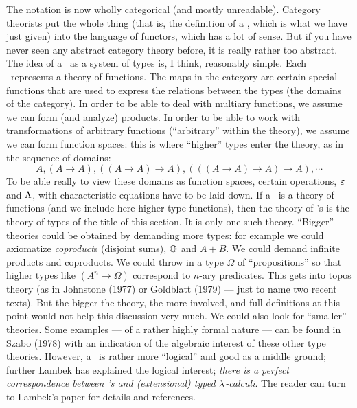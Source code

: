 The notation is now wholly categorical (and mostly unreadable). Category theorists put the
whole thing (that is, the definition of a \ccc, which is what we have just given) into the
language of functors, which has a lot of sense. But if you have never seen any abstract
category theory before, it is really rather too abstract. The idea of a \ccc\ as a system
of types is, I think, reasonably simple. Each \ccc\ represents a theory of functions. The
maps in the category are certain special functions that are used to express the relations
between the types (the domains of the category). In order to be able to deal with multiary
functions, we assume we can form (and analyze) products. In order to be able to work with
transformations of arbitrary functions (``arbitrary'' within the theory), we assume we can
form function spaces: this is where ``higher'' types enter the theory, as in the sequence
of domains:
$$
A, (A \to A), ((A \to A) \to A), (((A \to A) \to A) \to A), \cdots
$$
To be able really to view these domains as function spaces, certain operations, $\varepsilon$ and
$\Lambda$, with characteristic equations have to be laid down. If a \ccc\ is a theory of
functions (and we include here higher-type functions), then the theory of \ccc's is the
theory of types of the title of this section. It is only one such theory. ``Bigger''
theories could be obtained by demanding more types: for example we could axiomatize {\it
coproduct}s (disjoint sums), ${\mathbb O}$ and $A+ B$. We could demand infinite products and
coproducts. We could throw in a type $\Omega$ of ``propositions'' so that higher types
like $(A^n \to \Omega)$ correspond to $n$-ary predicates. This gets into topos theory (as
in Johnstone (1977) or Goldblatt (1979) --- just to name two recent texts). But the bigger
the theory, the more involved, and full definitions at this point would not help this
discussion very much. We could also look for ``smaller'' theories. Some examples --- of a
rather highly formal nature --- can be found in Szabo (1978) with an indication of the
algebraic interest of these other type theories. However, a \ccc\ is rather more
``logical'' and good as a middle ground; further Lambek has explained the logical
interest; {\it there is a perfect correspondence between \ccc's and (extensional) typed
$\lambda$-calculi}. The reader can turn to Lambek's paper for details and references.

\def\means#1{\llbracket\, #1 \,\rrbracket}

